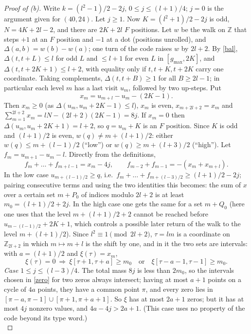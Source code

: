 \documentclass[11pt]{article}
\theoremstyle{remark}
\begin{document}
\begin{proof}[Proof of (b)] Write $k=(l^2-1)/2-2j$, $0\le j\le (l+1)/4$; $j=0$ is the argument given for $(40,24)$. Let $j\ge1$.
Now $K=(l^2+1)/2-2j$ is odd, $N=4K+2l-2$, and there are $2K+2l$ $F$ positions.
Let $w$ be the walk on $\mathbb Z$ that steps $+1$ at an $F$ position and $-1$ at a dot (positions unrolled), and
$\Delta(a,b)=w(b)-w(a)$; one turn of the code raises $w$ by $2l+2$. By \eqref{bal}, $\Delta(t,t+L)\le l$ for odd $L$ and $\le l+1$ for
even $L$ in $[g_{\max},2K]$, and $\Delta(t,t+2K+1)\le l+2$, with equality only if $t,t+K,t+2K$ carry one coordinate. Taking
complements, $\Delta(t,t+B)\ge 1$ for all $B\ge 2l-1$; in particular each level $m$ has a last visit $u_m$, followed by two up-steps.
Put
\[ x_m=u_{m+l}-u_m-(2K-1). \]
Then $x_m\ge 0$ (as $\Delta(u_m,u_m+2K-1)\le l$), $x_m$ is even, $x_{m+2l+2}=x_m$ and $\sum_{m=1}^{2l+2}x_m=lN-(2l+2)(2K-1)=8j$.
If $x_m=0$ then $\Delta(u_m,u_m+2K+1)=l+2$, so $q=u_m+K$ is an $F$ position. Since $K$ is odd and $(l+1)/2$ is even,
$w(q)\ne m+(l+1)/2$: either $w(q)\le m+(l-1)/2$ (``low'') or $w(q)\ge m+(l+3)/2$ (``high''). Let $f_m=u_{m+1}-u_m-l$. Directly from
the definitions,
\[ f_m+\dots+f_{m+l-1}=x_m-4j,\qquad f_{m-2}+f_{m-1}=-(x_m+x_{m+l}) . \]
In the low case $u_{m+(l-1)/2}\ge q$, i.e.\ $f_m+\dots+f_{m+(l-3)/2}\ge (l+1)/2-2j$; pairing consecutive terms and using the two
identities this becomes: the sum of $x$ over a certain set $m+P_0$ of indices modulo $2l+2$ is at least $m_0=(l+1)/2+2j$. In the
high case one gets the same for a set $m+Q_0$ (here one uses that the level $m+(l+1)/2+2$ cannot be reached before
$u_{m-(l-1)/2}+2K+1$, which controls a possible later return of the walk to the level $m+(l+1)/2$). Since $l^2\equiv 1 \pmod{2l+2}$,
$\tau=lm$ is a coordinate on $\mathbb Z_{2l+2}$ in which $m\mapsto m+l$ is the shift by one, and in it the two sets are intervals:
with $a=(l+1)/2$ and $\xi(\tau)=x_m$,
\begin{equation}\label{zero} \xi(\tau)=0\ \Longrightarrow\ \xi[\tau+1,\tau+a]\ge m_0\quad\text{or}\quad \xi[\tau-a-1,\tau-1]\ge m_0 . \end{equation}
\emph{Case $1\le j\le (l-3)/4$.} The total mass $8j$ is less than $2m_0$, so the intervals chosen in \eqref{zero} for two zeros always
intersect; having at most $a+1$ points on a cycle of $4a$ points, they have a common point $\pi$, and every zero lies in
$[\pi-a,\pi-1]\cup[\pi+1,\pi+a+1]$. So $\xi$ has at most $2a+1$ zeros; but it has at most $4j$ nonzero values, and
$4a-4j>2a+1$. (This case uses no property of the code beyond its type word.)\\

\end{proof}
\end{document}
